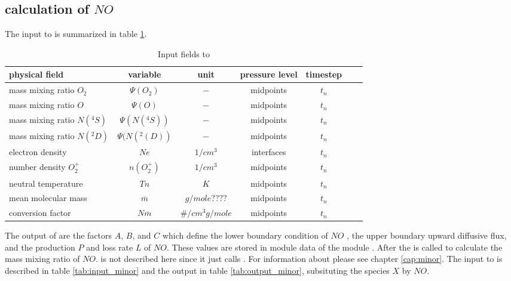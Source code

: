 \subsection{calculation of $NO$}\label{subcap:comp_no}
%
The input to  is summarized in table
\ref{tab:input_comp_no}.
%
\begin{table}[tb]
\begin{tabular}{|p{3.5cm} ||c|c|c|c|c|c|} \hline
physical field               & variable        & unit&pressure
level& timestep
\\ \hline \hline
%
mass mixing ratio $O_2$ &       $\Psi(O_2)$              & $-$   &  midpoints & $t_n$\\
mass mixing ratio $O$ &         $\Psi(O  )$              & $-$   &  midpoints & $t_n$\\
mass mixing ratio $N(^4S)$ &       $\Psi(N(^4S))$              & $-$   &  midpoints & $t_n$\\
mass mixing ratio $N(^2D)$ &       $\Psi(N(^2(D))$              & $-$   &  midpoints & $t_n$\\
electron density&       $Ne$              & $1/cm^3$   &  interfaces & $t_n$\\
number density $O_2^+$&       $n(O_2^+)$              & $1/cm^3$   &  midpoints & $t_n$\\
neutral temperature&       $Tn$              & $K$   &  midpoints & $t_n$\\
mean molecular mass&       $\overline{m}$              & $g/mole????$   &  midpoints & $t_n$\\
conversion factor&       $N \overline{m}$              & $\#/cm^3
g/mole$   &  midpoints & $t_n$
 \\ \hline
\end{tabular}
\caption{Input fields to }
\label{tab:input_comp_no}
\end{table}
%
The output of  are the factors $A$, $B$,
and $C$ which define the lower boundary condition of  $NO$ , the
upper boundary upward diffusive flux, and the production $P$ and
loss rate $L$ of $NO$. These values are stored in module data of the
module . After  the
 is called to calculate the mass mixing
ratio of $NO$.  is not described here
since it just calls . For information about
 please see chapter \ref{cap:minor}. The input
to  is described in table
\ref{tab:input_minor} and the output in table
\ref{tab:output_minor}, subsituting the species $X$ by $NO$. \\


